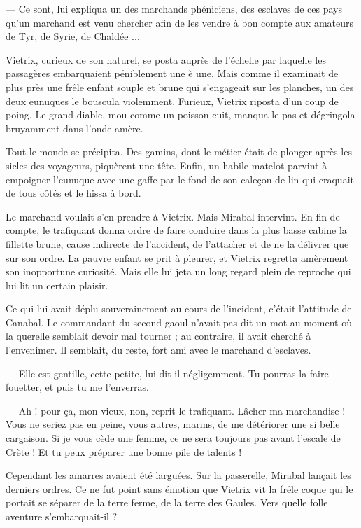 \documentclass[a4paper, 11pt, oneside, polutonikogreek, french]{article}
\begin{document}
--- Ce sont, lui expliqua un des marchands phéniciens, des esclaves de ces pays qu'un marchand est venu chercher afin de les vendre à bon compte aux amateurs de Tyr, de Syrie, de Chaldée ...

Vietrix, curieux de son naturel, se posta auprès de l'échelle par laquelle les passagères embarquaient péniblement une è une. Mais comme il examinait de plus près une frêle enfant souple et brune qui s'engageait sur les planches, un des deux eunuques le bouscula violemment. Furieux, Vietrix riposta d'un coup de poing. Le grand diable, mou comme un poisson cuit, manqua le pas et dégringola bruyamment dans l'onde amère.

Tout le monde se précipita. Des gamins, dont le métier était de plonger après les sicles des voyageurs, piquèrent une tête. Enfin, un habile matelot parvint à empoigner l'eunuque avec une gaffe par le fond de son caleçon de lin qui craquait de tous côtés et le hissa à bord.

Le marchand voulait s'en prendre à Vietrix. Mais Mirabal intervint. En fin de compte, le trafiquant donna ordre de faire conduire dans la plus basse cabine la fillette brune, cause indirecte de l'accident, de l'attacher et de ne la délivrer que sur son ordre. La pauvre enfant se prit à pleurer, et Vietrix regretta amèrement son inopportune curiosité. Mais elle lui jeta un long regard plein de reproche qui lui lit un certain plaisir.

Ce qui lui avait déplu souverainement au cours de l'incident, c'était l'attitude de Canabal. Le commandant du second gaoul n'avait pas dit un mot au moment où la querelle semblait devoir mal tourner ; au contraire, il avait cherché à l'envenimer. Il semblait, du reste, fort ami avec le marchand d'esclaves.

--- Elle est gentille, cette petite, lui dit-il négligemment. Tu pourras la faire fouetter, et puis tu me l'enverras.

--- Ah ! pour ça, mon vieux, non, reprit le trafiquant. Lâcher ma marchandise ! Vous ne seriez pas en peine, vous autres, marins, de me détériorer une si belle cargaison. Si je vous cède une femme, ce ne sera toujours pas avant l'escale de Crète ! Et tu peux préparer une bonne pile de talents !

\bigskip
\centerline{\EightStarTaper}
\centerline{\EightStarTaper\EightStarTaper}
\bigskip

Cependant les amarres avaient été larguées. Sur la passerelle, Mirabal lançait les derniers ordres. Ce ne fut point sans émotion que Vietrix vit la frêle coque qui le portait se séparer de la terre ferme, de la terre des Gaules. Vers quelle folle aventure s'embarquait-il ?
\end{document}
